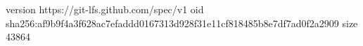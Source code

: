 version https://git-lfs.github.com/spec/v1
oid sha256:af9b9f4a3f628ac7efaddd0167313d928f31e11cf818485b8e7df7ad0f2a2909
size 43864
